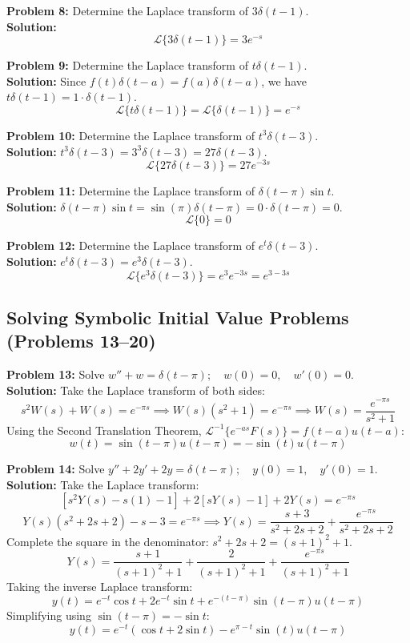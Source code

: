 \documentclass[11pt, letterpaper]{article}
\theoremstyle{definition}
\theoremstyle{remark}
\newcommand{\Laplace}{\mathcal{L}}
\begin{document}
\textbf{Problem 8:} Determine the Laplace transform of $3\delta(t - 1)$.
\\[4pt]
\textbf{Solution:} 
\[ \Laplace\{3\delta(t - 1)\} = 3e^{-s} \]

\textbf{Problem 9:} Determine the Laplace transform of $t\delta(t - 1)$.
\\[4pt]
\textbf{Solution:} Since $f(t)\delta(t-a) = f(a)\delta(t-a)$, we have $t\delta(t-1) = 1 \cdot \delta(t-1)$.
\[ \Laplace\{t\delta(t - 1)\} = \Laplace\{\delta(t-1)\} = e^{-s} \]

\textbf{Problem 10:} Determine the Laplace transform of $t^3\delta(t - 3)$.
\\[4pt]
\textbf{Solution:} $t^3\delta(t-3) = 3^3\delta(t-3) = 27\delta(t-3)$.
\[ \Laplace\{27\delta(t - 3)\} = 27e^{-3s} \]

\textbf{Problem 11:} Determine the Laplace transform of $\delta(t - \pi)\sin t$.
\\[4pt]
\textbf{Solution:} $\delta(t-\pi)\sin t = \sin(\pi)\delta(t-\pi) = 0 \cdot \delta(t-\pi) = 0$.
\[ \Laplace\{0\} = 0 \]

\textbf{Problem 12:} Determine the Laplace transform of $e^t\delta(t - 3)$.
\\[4pt]
\textbf{Solution:} $e^t\delta(t-3) = e^3\delta(t-3)$.
\[ \Laplace\{e^3\delta(t - 3)\} = e^3 e^{-3s} = e^{3-3s} \]

\subsection{Solving Symbolic Initial Value Problems (Problems 13--20)}

\textbf{Problem 13:} Solve $w'' + w = \delta(t - \pi); \quad w(0) = 0, \quad w'(0) = 0$.
\\[4pt]
\textbf{Solution:} Take the Laplace transform of both sides:
\[ s^2 W(s) + W(s) = e^{-\pi s} \implies W(s)(s^2 + 1) = e^{-\pi s} \implies W(s) = \frac{e^{-\pi s}}{s^2 + 1} \]
Using the Second Translation Theorem, $\Laplace^{-1}\{e^{-as}F(s)\} = f(t-a)u(t-a)$:
\[ w(t) = \sin(t - \pi)u(t - \pi) = -\sin(t)u(t - \pi) \]

\textbf{Problem 14:} Solve $y'' + 2y' + 2y = \delta(t - \pi); \quad y(0) = 1, \quad y'(0) = 1$.
\\[4pt]
\textbf{Solution:} Take the Laplace transform:
\[ [s^2 Y(s) - s(1) - 1] + 2[sY(s) - 1] + 2Y(s) = e^{-\pi s} \]
\[ Y(s)(s^2 + 2s + 2) - s - 3 = e^{-\pi s} \implies Y(s) = \frac{s + 3}{s^2 + 2s + 2} + \frac{e^{-\pi s}}{s^2 + 2s + 2} \]
Complete the square in the denominator: $s^2 + 2s + 2 = (s+1)^2 + 1$.
\[ Y(s) = \frac{s + 1}{(s+1)^2 + 1} + \frac{2}{(s+1)^2 + 1} + \frac{e^{-\pi s}}{(s+1)^2 + 1} \]
Taking the inverse Laplace transform:
\[ y(t) = e^{-t}\cos t + 2e^{-t}\sin t + e^{-(t-\pi)}\sin(t-\pi)u(t-\pi) \]
Simplifying using $\sin(t-\pi) = -\sin t$:
\[ y(t) = e^{-t}(\cos t + 2\sin t) - e^{\pi-t}\sin(t)u(t-\pi) \]
\end{document}
